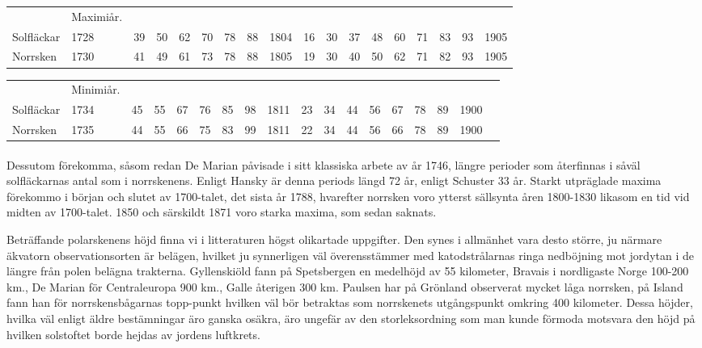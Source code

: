 \documentclass[a4paper, 12pt, oneside, swedish]{article}
\begin{document}
\begin{table}[H]
    \centering
    \footnotesize
    \Fontauri
    \begin{tabular}{p{10mm} p{8mm} p{2mm} p{2mm} p{2mm} p{2mm} p{2mm} p{2mm} p{4mm} p{2mm} p{2mm} p{2mm} p{2mm} p{2mm} p{2mm} p{2mm} p{2mm} p{4mm}}
        ~ & Maximiår.   & ~ & ~ & ~ & ~ & ~ & ~ & ~ & ~ & ~ & ~ & ~ & ~ & ~ & ~ & ~ & ~ \\
        Solfläckar & 1728 & 39 & 50 & 62 & 70 & 78 & 88 & 1804 & 16 & 30 & 37 & 48 & 60 & 71 & 83 & 93 & 1905 \\
        Norrsken & 1730 & 41 & 49 & 61 & 73 & 78 & 88 & 1805 & 19 & 30 & 40 & 50 & 62 & 71 & 82 & 93 & 1905 \\
    \end{tabular}
\end{table}

\begin{table}[H]
    \centering
    \footnotesize
    \Fontauri
    \begin{tabular}{p{12mm} p{10mm} p{2mm} p{2mm} p{2mm} p{2mm} p{2mm} p{2mm} p{4mm} p{2mm} p{2mm} p{2mm} p{2mm} p{2mm} p{2mm} p{2mm} p{2mm} p{4mm}}
        ~ & Minimiår. & ~ & ~ & ~ & ~ & ~ & ~ & ~ & ~ & ~ & ~ & ~ & ~ & ~ & ~ & ~ \\
        Solfläckar & 1734 & 45 & 55 & 67 & 76 & 85 & 98 & 1811 & 23 & 34 & 44 & 56 & 67 & 78 & 89 & 1900 \\
        Norrsken & 1735 & 44 & 55 & 66 & 75 & 83 & 99 & 1811 & 22 & 34 & 44 & 56 & 66 & 78 & 89 & 1900 \\
    \end{tabular}
\end{table}
\paragraph{}
Dessutom förekomma, såsom redan De Marian påvisade i sitt klassiska arbete av år 1746, längre perioder som återfinnas i såväl solfläckarnas antal som i norrskenens. Enligt Hansky är denna periods längd 72 år, enligt Schuster 33 år. Starkt utpräglade maxima förekommo i början och slutet av 1700-talet, det sista år 1788, hvarefter norrsken voro ytterst sällsynta åren 1800-1830 likasom en tid vid midten av 1700-talet. 1850 och särskildt 1871 voro starka maxima, som sedan saknats.

Beträffande polarskenens höjd finna vi i litteraturen högst olikartade uppgifter. Den synes i allmänhet vara desto större, ju närmare äkvatorn observationsorten är belägen, hvilket ju synnerligen väl överensstämmer med katodstrålarnas ringa nedböjning mot jordytan i de längre från polen belägna trakterna. Gyllenskiöld fann på Spetsbergen en medelhöjd av 55 kilometer, Bravais i nordligaste Norge 100-200 km., De Marian för Centraleuropa 900 km., Galle återigen 300 km. Paulsen har på Grönland observerat mycket låga norrsken, på Island fann han för norrskensbågarnas topp-punkt hvilken väl bör betraktas som norrskenets utgångspunkt omkring 400 kilometer. Dessa höjder, hvilka väl enligt äldre bestämningar äro ganska osäkra, äro ungefär av den storleksordning som man kunde förmoda motsvara den höjd på hvilken solstoftet borde hejdas av jordens luftkrets.
\end{document}
